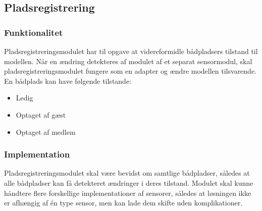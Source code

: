 \subsection{Pladsregistrering}
\label{sub:plads_registrering}

\subsubsection{Funktionalitet}
\label{ssub:plads_registrering_funktionalitet}

Pladsregistreringsmodulet har til opgave at videreformidle bådpladsers tilstand til modellen. Når en ændring detekteres af modulet af et separat sensormodul, skal pladsregistreringsmodulet fungere som en adapter og ændre modellen tilsvarende. En bådplads kan have følgende tilstande:

\begin{itemize}
  \item Ledig
  \item Optaget af gæst
  \item Optaget af medlem
\end{itemize}

\subsubsection{Implementation}
\label{ssub:plads_registrering_implementation}

Pladsregistreringsmodulet skal være bevidst om samtlige bådpladser, således at alle bådpladser kan få detekteret ændringer i deres tilstand. 
Modulet skal kunne håndtere flere forskellige implementationer af sensorer, således at løsningen ikke er afhængig af én type sensor, men kan lade dem skifte uden komplikationer.
